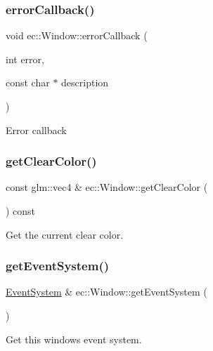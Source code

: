 \subsubsection{\texorpdfstring{error\+Callback()}{errorCallback()}}
{\footnotesize\ttfamily void ec\+::\+Window\+::error\+Callback (\begin{DoxyParamCaption}\item[{int}]{error,  }\item[{const char $\ast$}]{description }\end{DoxyParamCaption})\hspace{0.3cm}{\ttfamily [static]}}

Error callback \mbox{\label{classec_1_1_window_a4355925b4898e5b032da048eec86f103}} 
\subsubsection{\texorpdfstring{get\+Clear\+Color()}{getClearColor()}}
{\footnotesize\ttfamily const glm\+::vec4 \& ec\+::\+Window\+::get\+Clear\+Color (\begin{DoxyParamCaption}{ }\end{DoxyParamCaption}) const}

Get the current clear color. \mbox{\label{classec_1_1_window_a9dda11a247352aa51fea720076174535}} 
\subsubsection{\texorpdfstring{get\+Event\+System()}{getEventSystem()}}
{\footnotesize\ttfamily \mbox{\hyperlink{classec_1_1_event_system}{Event\+System}} \& ec\+::\+Window\+::get\+Event\+System (\begin{DoxyParamCaption}{ }\end{DoxyParamCaption})}

Get this window\textquotesingle{}s event system. \mbox{\label{classec_1_1_window_a13d8cba249c2de0a5366c2507e887290}} 
